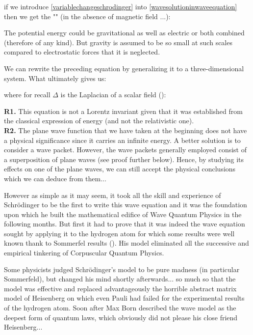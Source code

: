 	if we introduce \ref{variablechangeschrodinger} into \ref{wavesolutioninwaveequation} then we get the "" (in the absence of magnetic field ...):
	
	\begin{tcolorbox}[title=Remark,colframe=black,arc=10pt]
	The potential energy could be gravitational as well as electric or both combined (therefore of any kind). But gravity is assumed to be so small at such scales compared to electrostatic forces that it is neglected.
	\end{tcolorbox}
	We can rewrite the preceding equation by generalizing it to a three-dimensional system. What ultimately gives us:
	
	where for recall $\Delta$ is the Laplacian of a scalar field ():
	
	\begin{tcolorbox}[title=Remarks,colframe=black,arc=10pt]
	\textbf{R1.} This equation is not a Lorentz invariant given that it was established from the classical expression of energy (and not the relativistic one).\\
	
	\textbf{R2.} The plane wave function that we have taken at the beginning does not have a physical significance since it carries an infinite energy. A better solution is to consider a wave packet. However, the wave packets generally employed consist of a superposition of plane waves (see proof further below). Hence, by studying its effects on one of the plane waves, we can still accept the physical conclusions which we can deduce from them...
	\end{tcolorbox}
	However as simple as it may seem, it took all the skill and experience of Schrödinger to be the first to write this wave equation and it was the foundation upon which he built the mathematical edifice of Wave Quantum Physics in the following months. But first it had to prove that it was indeed the wave equation sought by applying it to the hydrogen atom for which some results were well known thank to Sommerfel results (). His model eliminated all the successive and empirical tinkering of Corpuscular Quantum Physics.

	Some physicists judged Schrödinger's model to be pure madness (in particular Sommerfeld), but changed his mind shortly afterwards... so much so that the model was effective and replaced advantageously the horrible abstract matrix model of Heisenberg on which even Pauli had failed for the experimental results of the hydrogen atom. Soon after Max Born described the wave model as the deepest form of quantum laws, which obviously did not please his close friend Heisenberg...
	
